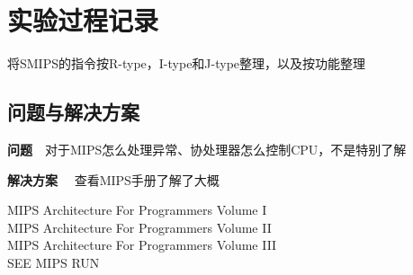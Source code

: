 \documentclass[UTF8]{ctexart}
\begin{document}

\section{实验过程记录}\label{labrec}

将SMIPS的指令按R-type，I-type和J-type整理，以及按功能整理

\subsection{问题与解决方案}

\textbf{问题}\ \ 对于MIPS怎么处理异常、协处理器怎么控制CPU，不是特别了解

\textbf{解决方案} \ \ 查看MIPS手册了解了大概
\appendix

\newpage
\begin{thebibliography}{9}
	MIPS Architecture For Programmers Volume I  \\
	MIPS Architecture For Programmers Volume II \\
	MIPS Architecture For Programmers Volume III \\
	SEE MIPS RUN \\
\end{thebibliography}
\end{document}
